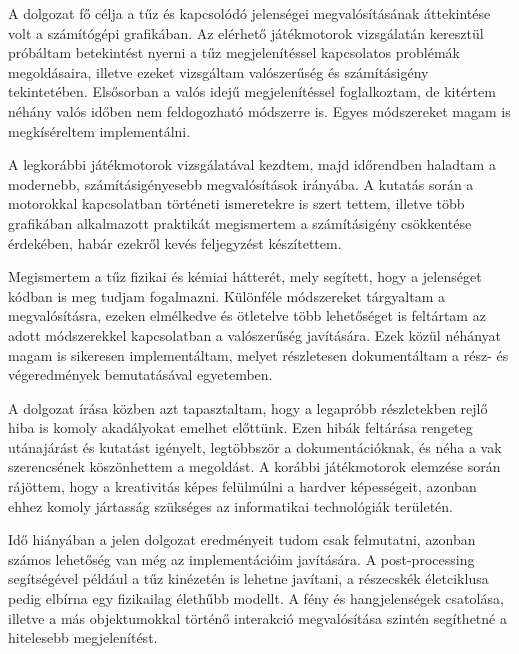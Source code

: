 
A dolgozat fő célja a tűz és kapcsolódó jelenségei megvalósításának áttekintése volt a számítógépi grafikában. Az elérhető játékmotorok vizsgálatán keresztül próbáltam betekintést nyerni a tűz megjelenítéssel kapcsolatos problémák megoldásaira, illetve ezeket vizsgáltam valószerűség és számításigény tekintetében. Elsősorban a valós idejű megjelenítéssel foglalkoztam, de kitértem néhány valós időben nem feldogozható módszerre is. Egyes módszereket magam is megkíséreltem implementálni.

A legkorábbi játékmotorok vizsgálatával kezdtem, majd időrendben haladtam a modernebb, számításigényesebb megvalósítások irányába. A kutatás során a motorokkal kapcsolatban történeti ismeretekre is szert tettem, illetve több grafikában alkalmazott praktikát megismertem a számításigény csökkentése érdekében, habár ezekről kevés feljegyzést készítettem. 

Megismertem a tűz fizikai és kémiai hátterét, mely segített, hogy a jelenséget kódban is meg tudjam fogalmazni. Különféle módszereket tárgyaltam a megvalósításra, ezeken elmélkedve és ötletelve több lehetőséget is feltártam az adott módszerekkel kapcsolatban a valószerűség javítására. 
Ezek közül néhányat magam is sikeresen implementáltam, melyet részletesen dokumentáltam a rész- és végeredmények bemutatásával egyetemben. 

A dolgozat írása közben azt tapasztaltam, hogy a legapróbb részletekben rejlő hiba is komoly akadályokat emelhet előttünk. Ezen hibák feltárása rengeteg utánajárást és kutatást igényelt, legtöbbször a dokumentációknak, és néha a vak szerencsének köszönhettem a megoldást. A korábbi játékmotorok elemzése során rájöttem, hogy a kreativitás képes felülmúlni a hardver képességeit, azonban ehhez komoly jártasság szükséges az informatikai technológiák területén. 


Idő hiányában a jelen dolgozat eredményeit tudom csak felmutatni, azonban számos lehetőség van még az implementációim javítására. A post-processing segítségével például a tűz kinézetén is lehetne javítani, a részecskék életciklusa pedig elbírna egy fizikailag élethűbb modellt. A fény és hangjelenségek csatolása, illetve a más objektumokkal történő interakció megvalósítása szintén segíthetné a hitelesebb megjelenítést. 

